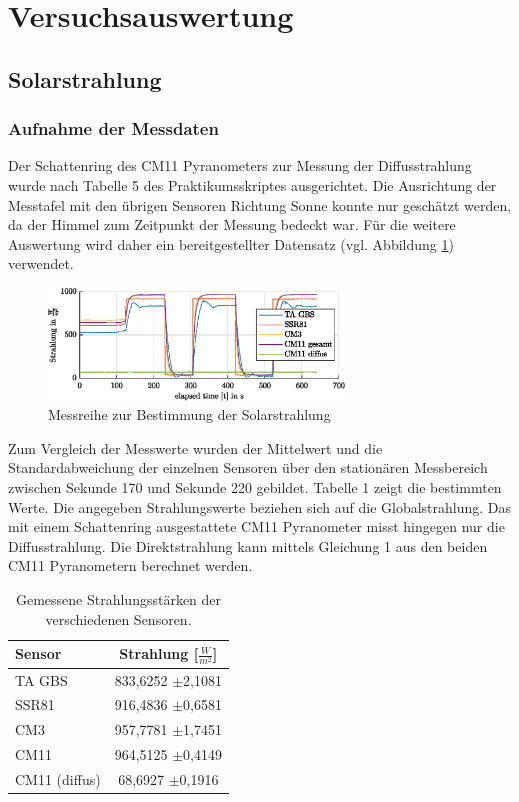 \section{Versuchsauswertung}

\subsection{Solarstrahlung} 

\subsubsection{Aufnahme der Messdaten}

Der Schattenring des CM11 Pyranometers zur Messung der Diffusstrahlung wurde nach Tabelle 5 des Praktikumsskriptes ausgerichtet. Die Ausrichtung der Messtafel mit den übrigen Sensoren Richtung Sonne konnte nur geschätzt werden, da der Himmel zum Zeitpunkt der Messung bedeckt war. Für die weitere Auswertung wird daher ein bereitgestellter Datensatz (vgl. Abbildung \ref{fig:radiation}) verwendet.

\begin{figure}[H]
	\centering
	\includegraphics[width=0.7\textwidth]{../DATA/Messreihe_Strahlung.eps}
	\caption[Messreihe zur Bestimmung der Solarstrahlung]{Messreihe zur Bestimmung der Solarstrahlung}
	\label{fig:radiation}
\end{figure}
Zum Vergleich der Messwerte wurden der Mittelwert und die Standardabweichung der einzelnen Sensoren über den stationären Messbereich zwischen Sekunde 170 und Sekunde 220 gebildet. Tabelle 1 zeigt die bestimmten Werte. Die angegeben Strahlungswerte beziehen sich auf die Globalstrahlung. Das mit einem Schattenring ausgestattete CM11 Pyranometer misst hingegen nur die Diffusstrahlung. Die Direktstrahlung kann mittels  Gleichung 1 aus den beiden CM11 Pyranometern berechnet werden.

\begin{table}[H]
	\centering
\begin{tabular}{l|c}
	\textbf{Sensor} & \textbf{Strahlung [$\frac{W}{m^2}$]}\\
	\hline
	TA GBS & 833,6252 $\pm$2,1081\\
	SSR81 & 916,4836 $\pm$0,6581\\
	CM3 & 957,7781 $\pm$1,7451\\
	CM11 & 964,5125 $\pm$0,4149\\
	CM11 (diffus) & 68,6927 $\pm$0,1916
\end{tabular} 

	\caption{Gemessene Strahlungsstärken der verschiedenen Sensoren.}
	\label{tab:radiation}
\end{table}


